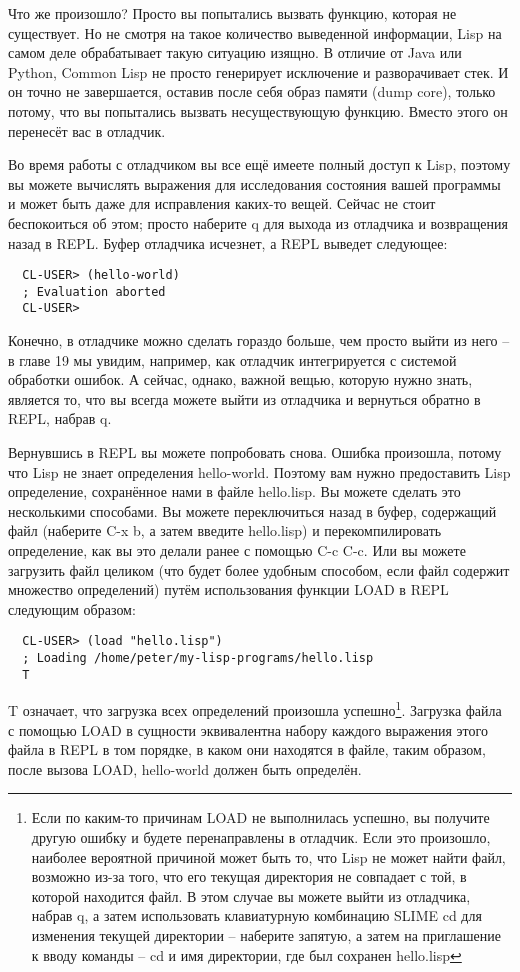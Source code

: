 Что же произошло? Просто вы попытались вызвать функцию, которая не существует. Но не
смотря на такое количество выведенной информации, Lisp на самом деле обрабатывает такую
ситуацию изящно. В отличие от Java или Python, Common Lisp не просто генерирует исключение
и разворачивает стек. И он точно не завершается, оставив после себя образ памяти (dump
core), только потому, что вы попытались вызвать несуществующую функцию. Вместо этого он
перенесёт вас в отладчик.

Во время работы с отладчиком вы все ещё имеете полный доступ к Lisp, поэтому вы можете
вычислять выражения для исследования состояния вашей программы и может быть даже для
исправления каких-то вещей. Сейчас не стоит беспокоиться об этом; просто наберите q для
выхода из отладчика и возвращения назад в REPL. Буфер отладчика исчезнет, а REPL выведет
следующее:

\begin{verbatim}
  CL-USER> (hello-world) 
  ; Evaluation aborted
  CL-USER>
\end{verbatim}

Конечно, в отладчике можно сделать гораздо больше, чем просто выйти из него -- в главе 19
мы увидим, например, как отладчик интегрируется с системой обработки ошибок. А сейчас,
однако, важной вещью, которую нужно знать, является то, что вы всегда можете выйти из
отладчика и вернуться обратно в REPL, набрав q.

Вернувшись в REPL вы можете попробовать снова. Ошибка произошла, потому что Lisp не знает
определения hello-world. Поэтому вам нужно предоставить Lisp определение, сохранённое нами
в файле hello.lisp. Вы можете сделать это несколькими способами. Вы можете переключиться
назад в буфер, содержащий файл (наберите C-x b, а затем введите hello.lisp) и
перекомпилировать определение, как вы это делали ранее с помощью C-c C-c. Или вы можете
загрузить файл целиком (что будет более удобным способом, если файл содержит множество
определений) путём использования функции LOAD в REPL следующим образом:

\begin{verbatim}
  CL-USER> (load "hello.lisp")
  ; Loading /home/peter/my-lisp-programs/hello.lisp
  T
\end{verbatim}

T означает, что загрузка всех определений произошла успешно\footnote{Если по каким-то
  причинам LOAD не выполнилась успешно, вы получите другую ошибку и будете перенаправлены
  в отладчик. Если это произошло, наиболее вероятной причиной может быть то, что Lisp не
  может найти файл, возможно из-за того, что его текущая директория не совпадает с той, в
  которой находится файл. В этом случае вы можете выйти из отладчика, набрав q, а затем
  использовать клавиатурную комбинацию SLIME cd для изменения текущей директории --
  наберите запятую, а затем на приглашение к вводу команды -- cd и имя директории, где был
  сохранен hello.lisp}. Загрузка файла с помощью LOAD в сущности эквивалентна набору
каждого выражения этого файла в REPL в том порядке, в каком они находятся в файле, таким
образом, после вызова LOAD, hello-world должен быть определён.

